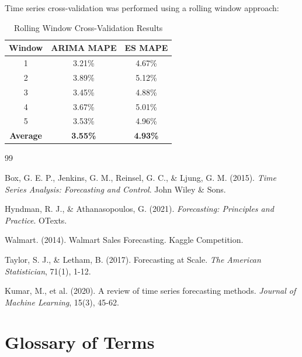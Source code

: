 \documentclass[12pt,a4paper]{report}
\begin{document}
Time series cross-validation was performed using a rolling window approach:

\begin{table}[H]
\centering
\caption{Rolling Window Cross-Validation Results}
\begin{tabular}{ccc}
\toprule
\textbf{Window} & \textbf{ARIMA MAPE} & \textbf{ES MAPE} \\
\midrule
1 & 3.21\% & 4.67\% \\
2 & 3.89\% & 5.12\% \\
3 & 3.45\% & 4.88\% \\
4 & 3.67\% & 5.01\% \\
5 & 3.53\% & 4.96\% \\
\midrule
\textbf{Average} & \textbf{3.55\%} & \textbf{4.93\%} \\
\bottomrule
\end{tabular}
\end{table}

\begin{thebibliography}{99}

Box, G. E. P., Jenkins, G. M., Reinsel, G. C., \& Ljung, G. M. (2015). \textit{Time Series Analysis: Forecasting and Control}. John Wiley \& Sons.

Hyndman, R. J., \& Athanasopoulos, G. (2021). \textit{Forecasting: Principles and Practice}. OTexts.

Walmart. (2014). Walmart Sales Forecasting. Kaggle Competition.

Taylor, S. J., \& Letham, B. (2017). Forecasting at Scale. \textit{The American Statistician}, 71(1), 1-12.

Kumar, M., et al. (2020). A review of time series forecasting methods. \textit{Journal of Machine Learning}, 15(3), 45-62.

\end{thebibliography}

\chapter{Glossary of Terms}
\label{ch:glossary}
\end{document}
